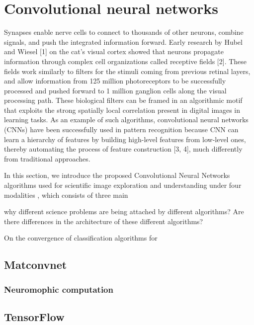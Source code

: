 \section{Convolutional neural networks}\label{sec:met}
Synapses enable nerve cells to connect to thousands of other neurons, combine signals, and push the integrated information forward. Early research by Hubel and Wiesel [1] on the cat’s visual cortex showed that neurons propagate information through complex cell organizations called receptive fields [2]. These fields work similarly to filters for the stimuli coming from previous retinal layers, and allow information from 125 million photoreceptors to be successfully processed and pushed forward to 1 million ganglion cells along the visual processing path. These biological filters can be framed in an algorithmic motif that exploits the strong spatially local correlation present in digital images in learning tasks. As an example of such algorithms, convolutional neural networks (CNNs) have been successfully used in pattern recognition because CNN can learn a hierarchy of features by building high-level features from low-level ones, thereby automating the process of feature construction [3, 4], much differently from traditional approaches.

In this section, we introduce the proposed Convolutional Neural Networks algorithms used for scientific image exploration and understanding under four modalities
, which consists of three main

why different science problems are being attached by different algorithms? Are there differences in the architecture of these different algorithms?

On the convergence of classification algorithms for

\subsection{Matconvnet}

\subsubsection{Neuromophic computation}


\subsection{TensorFlow}
